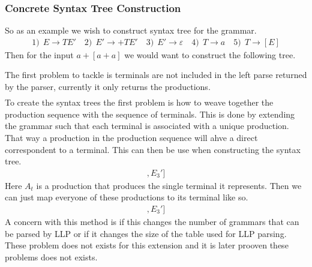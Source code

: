 \documentclass[a4paper,12pt]{article}
\theoremstyle{definition}
\begin{document}
\subsubsection{Concrete Syntax Tree Construction}
So as an example we wish to construct syntax tree for the grammar.
\begin{gather*}
  1)\:\: E \to TE' \quad 2)\:\: E' \to +TE' \quad 3)\:\: E' \to \varepsilon \quad 4)\:\: T \to a \quad 5) \: \: T \to [E]
\end{gather*}
Then for the input $a+[a + a]$ we would want to construct the following tree.
\begin{center}
\end{center}
The first problem to tackle is terminals are not included in the left parse returned by the parser, currently it only returns the productions.
\begin{gather*}
  [E_1, T_4, E_2', T_5, E_1, T_4, E_2', T_4, E_3', E_3']
\end{gather*}
To create the syntax trees the first problem is how to weave together the production sequence with the sequence of terminals. This is done by extending the grammar such that each terminal is associated with a unique production. That way a production in the production sequence will ahve a direct correspondent to a terminal. This can then be use when constructing the syntax tree.
\begin{gather*}
  [E_1, T_4, A_a, E_2', A_+, T_5, A_[, E_1, T_4, A_a, E_2', A_+, T_4, A_a, E_3', A_], E_3']
\end{gather*}
Here $A_t$ is a production that produces the single terminal it represents. Then we can just map everyone of these productions to its terminal like so.
\begin{gather*}
  [E_1, T_4, a, E_2', +, T_5, [, E_1, T_4, a, E_2', +, T_4, a, E_3', ], E_3']
\end{gather*}
A concern with this method is if this changes the number of grammars that can be parsed by LLP or if it changes the size of the table used for LLP parsing. These problem does not exists for this extension and it is later prooven these problems does not exists.
\end{document}
